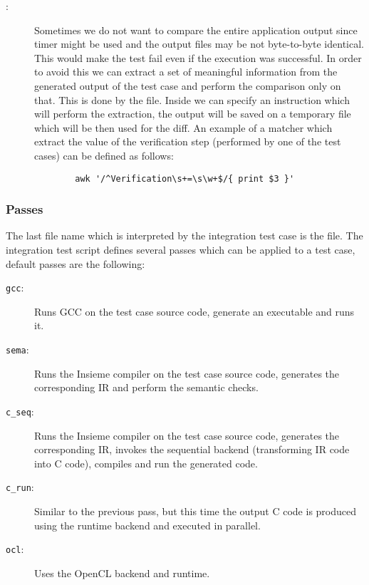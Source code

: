 \begin{description}
	\item[:] Sometimes we do not want to compare the entire
		application output since timer might be used and the output files may be
		not byte-to-byte identical. This would make the test fail even if the
		execution was successful. In order to avoid this we can extract a set of
		meaningful information from the generated output of the test case and
		perform the comparison only on that. This is done by the
		 file. Inside we can specify an instruction which will
		perform the extraction, the output will be saved on a temporary file which
		will be then used for the diff. An example of a matcher which extract the
		value of the verification step (performed by one of the test cases) can be
		defined as follows: 
		\begin{verbatim} 
		awk '/^Verification\s+=\s\w+$/{ print $3 }'
		\end{verbatim} 

\end{description}

\subsubsection{Passes}
The last file name which is interpreted by the integration test case is the
 file. The integration test script defines several passes which can
be applied to a test case, default passes are the following:

\begin{description}

	\item[\texttt{gcc}:] Runs GCC on the test case source code, generate an executable and
		runs it.

	\item[\texttt{sema}:] Runs the Insieme compiler on the test case source code,
		generates the corresponding IR and perform the semantic checks.

	\item[\texttt{c\_seq}:] Runs the Insieme compiler on the test case source code,
		generates the corresponding IR, invokes the sequential backend
		(transforming IR code into C code), compiles and run the generated code.

	\item[\texttt{c\_run}:] Similar to the previous pass, but this time the output C
		code is produced using the runtime backend and executed in parallel. 

	\item[\texttt{ocl}:] Uses the OpenCL backend and runtime. 

\end{description}

